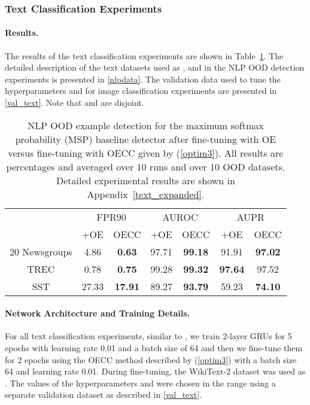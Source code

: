 \documentclass{article} \usepackage{iclr2020_conference,times}
\begin{document}
\subsubsection{Text Classification Experiments}\label{refer_cal_2}

\paragraph{Results.} The results of the text classification experiments are shown in Table~\ref{NLP_OE_zipped_exp}. The detailed description of the text datasets used as ,  and  in the NLP OOD detection experiments is presented in \ref{nlpdata}.
The validation data  used to tune the hyperparameters  and  for image classification experiments are presented in \ref{val_text}. Note that  and  are disjoint.
\begin{table}[h]
\begin{center}
\begin{tabular}{c|cc|cc|cc}
\multicolumn{1}{c}{}&\multicolumn{2}{c}{FPR90}&\multicolumn{2}{c}{AUROC}&\multicolumn{2}{c}{AUPR}\\
\cline{2-7} 
&+OE&OECC&+OE&OECC&+OE&OECC\\
\hline
\multirow{1}{*}{{{20 Newsgroups}}}&4.86&\textbf{0.63}&97.71&\textbf{99.18}&91.91&\textbf{97.02}\\
\multirow{1}{*}{{{TREC}}}&0.78&\textbf{0.75}&99.28&\textbf{99.32}&\textbf{97.64}&97.52\\
\multirow{1}{*}{{{SST}}}&27.33&\textbf{17.91}&89.27&\textbf{93.79}&59.23&\textbf{74.10}\\
\hline
\end{tabular}
\end{center}
\caption{\label{NLP_OE_zipped_exp}NLP OOD example detection for the maximum softmax probability (MSP) baseline detector after fine-tuning with OE \citep{hendrycks2019oe} versus fine-tuning with OECC given by (\ref{optim3}). All results are percentages and averaged over 10 runs and over 10 OOD datasets. Detailed experimental results are shown in Appendix~\ref{text_expanded}.}
\end{table}
\vspace{-10pt}
\paragraph{Network Architecture and Training Details.} For all text classification experiments, similar to \cite{hendrycks2019oe}, we train 2-layer GRUs \citep{conf/emnlp/ChoMGBBSB14} for 5 epochs with learning rate 0.01 and a batch size of 64 and then we fine-tune them for 2 epochs using the OECC method described by (\ref{optim3}) with a batch size 64 and learning rate 0.01. During fine-tuning, the WikiText-2 dataset was used as . The values of the hyperparameters  and  were chosen in the range  using a separate validation dataset as described in \ref{val_text}.
\end{document}
